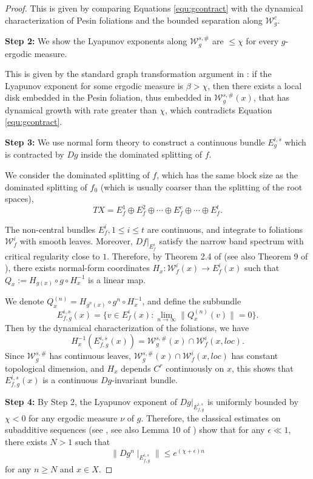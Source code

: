 \documentclass[11pt]{amsart}
\numberwithin{equation}{section}
\newcommand{\W}{\mathcal{W}}
\theoremstyle{plain}
\begin{document}
\begin{proof}
This is given by comparing Equations \ref{equ:gcontract} with the dynamical characterization of Pesin foliations and the bounded separation along \(\W^c_g\).


\textbf{Step 2:} We show the Lyapunov exponents along $\W^{s,\#}_g$ are $\le \chi$ for every $g$-ergodic measure.

This is given by the standard graph transformation argument in \cite[Theorem 3.16]{PuShergo}: if the Lyapunov exponent for some ergodic measure is $\beta > \chi$, then there exists a local disk embedded in the Pesin foliation, thus embedded in $\W^{s,\#}_g(x)$, that has dynamical growth with rate greater than $\chi$, which contradicts Equation \ref{equ:gcontract}.


\textbf{Step 3:} We use normal form theory to construct a continuous bundle $E^{i,s}_g$ which is contracted by $Dg$ inside the dominated splitting of $f$. 

We consider the dominated splitting of $f$, which has the same block size as the dominated splitting of $f_0$ (which is usually coarser than the splitting of the root spaces), $$TX=E^1_f\oplus E^2_f\oplus \cdots \oplus E^c_f\oplus \cdots \oplus E^t_f.$$ 

The non-central bundles $E^i_f, 1\le i\le t$ are continuous, and integrate to foliations $\W^i_f$ with smooth leaves. Moreover, $Df|_{E^i_f}$ satisfy the narrow band spectrum with critical regularity close to $1$. Therefore, by Theorem 2.4 of \cite{normalform} (see also Theorem 9 of \cite{DWX}), there exists normal-form coordinates $H_x:\W^i_f(x)\to E^i_f(x)$ such that $Q_x:=H_{g(x)}\circ g\circ H^{-1}_x$ is a linear map.

We denote $Q^{(n)}_x=H_{g^n(x)}\circ g^n\circ H^{-1}_x$, and define the subbundle $$E^{i,s}_{f,g}(x)=\{v\in E^i_f(x): \lim_{n\to \infty} \|Q^{(n)}_x(v)\|=0\}.$$ Then by the dynamical characterization of the foliations, we have $$H_x^{-1}(E^{i,s}_{f,g}(x))=\W^{s,\#}_g(x)\cap \W^i_f(x,loc).$$ 
Since $\W^{s,\#}_g$ has continuous leaves, $\W^{s,\#}_g(x)\cap \W^i_f(x,loc)$ has constant topological dimension, and $H_x$ depends $C^r$ continuously on $x$, this shows that $E^{i,s}_{f,g}(x)$ is a continuous $Dg$-invariant bundle. 

\textbf{Step 4:} By Step 2, the Lyapunov exponent of $Dg|_{E^{i,s}_{f,g}}$ is uniformly bounded by $\chi<0$ for any ergodic measure $\nu$ of $g$. Therefore, the classical estimates on subadditive sequences (see \cite{SCHREIBER1998334}, see also Lemma 10 of \cite{DWX}) show that for any $\epsilon \ll 1$, there exists $N > 1$ such that
$$\|Dg^n \mid_{E^{i,s}_{f,g}}\|\le e^{(\chi+\epsilon) n}$$
for any $n \ge N$ and $x \in X$. 


\end{proof}
\end{document}

